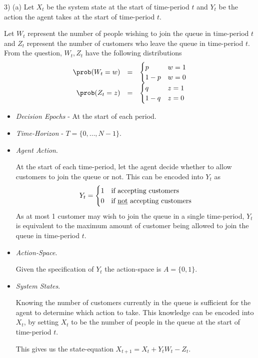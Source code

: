 \documentclass[11pt,a4paper]{article}
\begin{document}
\begin{answer}{3) (a)}
  Let $X_t$ be the system state at the start of time-period $t$ and $Y_t$ be the action the agent takes at the start of time-period $t$.
  \par Let $W_t$ represent the number of people wishing to join the queue in time-period $t$ and $Z_t$ represent the number of customers who leave the queue in time-period $t$. From the question, $W_t,Z_t$ have the following distributions
  \[\begin{array}{rcl}
    \prob(W_t=w)&=&\begin{cases}
      p&w=1\\
      1-p&w=0
    \end{cases}\\
    \prob(Z_t=z)&=&\begin{cases}
      q&z=1\\
      1-q&z=0
    \end{cases}
  \end{array}\]
  \begin{itemize}

    \item \textit{Decision Epochs} - At the start of each period.

    \item \textit{Time-Horizon} - $T=\{0,\dots,N-1\}$.

    \item \textit{Agent Action}.
    \par At the start of each time-period, let the agent decide whether to allow customers to join the queue or not. This can be encoded into $Y_t$ as
    \[ Y_t=\begin{cases}
    1&\text{if accepting customers}\\
    0&\text{if \underline{not} accepting customers}
    \end{cases} \]
    As at most 1 customer may wish to join the queue in a single time-period, $Y_t$ is equivalent to the maximum amount of customer being allowed to join the queue in time-period $t$.

    \item \textit{Action-Space}.
    \par Given the specification of $Y_t$ the action-space is $A=\{0,1\}$.

    \item \textit{System States}.
    \par Knowing the number of customers currently in the queue is sufficient for the agent to determine which action to take. This knowledge can be encoded into $X_t$, by setting $X_t$ to be the number of people in the queue at the start of time-period $t$.
    \par This gives us the state-equation $X_{t+1}=X_t+Y_tW_t-Z_t$.


\end{itemize}
\end{answer}
\end{document}
